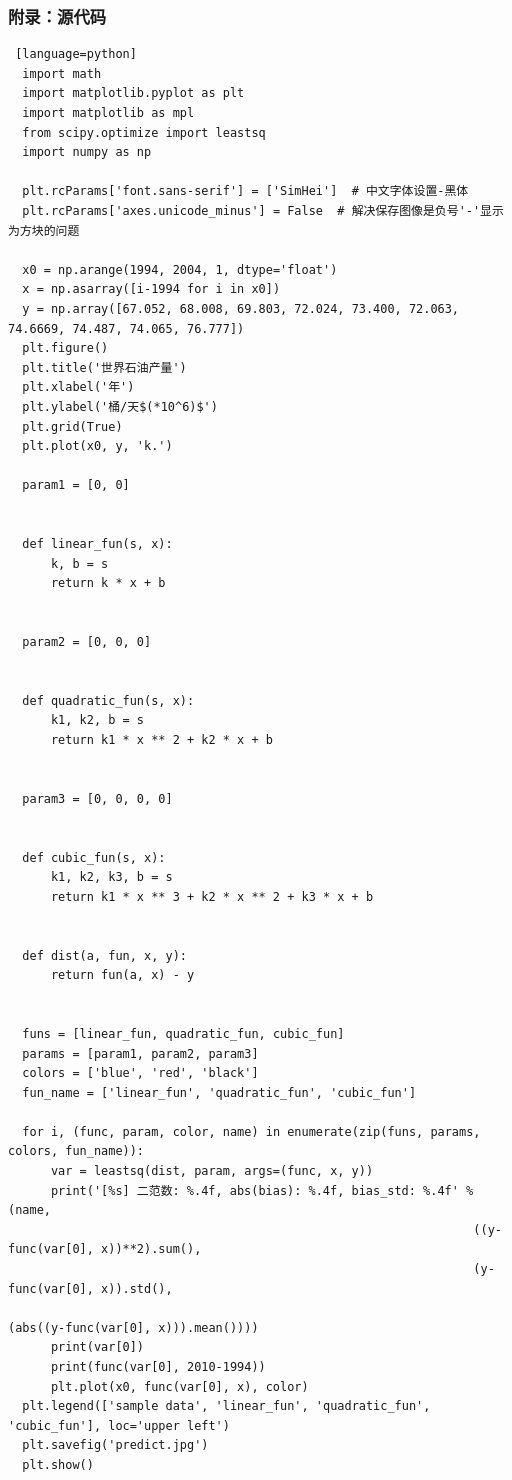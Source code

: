 \documentclass[UTF8]{ctexart}
\begin{document}
\subsubsection{附录：源代码}
\begin{lstlisting} [language=python]
  import math
  import matplotlib.pyplot as plt
  import matplotlib as mpl
  from scipy.optimize import leastsq
  import numpy as np
  
  plt.rcParams['font.sans-serif'] = ['SimHei']  # 中文字体设置-黑体
  plt.rcParams['axes.unicode_minus'] = False  # 解决保存图像是负号'-'显示为方块的问题
  
  x0 = np.arange(1994, 2004, 1, dtype='float')
  x = np.asarray([i-1994 for i in x0])
  y = np.array([67.052, 68.008, 69.803, 72.024, 73.400, 72.063, 74.6669, 74.487, 74.065, 76.777])
  plt.figure()
  plt.title('世界石油产量')
  plt.xlabel('年')
  plt.ylabel('桶/天$(*10^6)$')
  plt.grid(True)
  plt.plot(x0, y, 'k.')
  
  param1 = [0, 0]
  
  
  def linear_fun(s, x):
      k, b = s
      return k * x + b
  
  
  param2 = [0, 0, 0]
  
  
  def quadratic_fun(s, x):
      k1, k2, b = s
      return k1 * x ** 2 + k2 * x + b
  
  
  param3 = [0, 0, 0, 0]
  
  
  def cubic_fun(s, x):
      k1, k2, k3, b = s
      return k1 * x ** 3 + k2 * x ** 2 + k3 * x + b
  
  
  def dist(a, fun, x, y):
      return fun(a, x) - y
  
  
  funs = [linear_fun, quadratic_fun, cubic_fun]
  params = [param1, param2, param3]
  colors = ['blue', 'red', 'black']
  fun_name = ['linear_fun', 'quadratic_fun', 'cubic_fun']
  
  for i, (func, param, color, name) in enumerate(zip(funs, params, colors, fun_name)):
      var = leastsq(dist, param, args=(func, x, y))
      print('[%s] 二范数: %.4f, abs(bias): %.4f, bias_std: %.4f' % (name,
                                                                 ((y-func(var[0], x))**2).sum(),
                                                                 (y-func(var[0], x)).std(),
                                                                 (abs((y-func(var[0], x))).mean())))
      print(var[0])
      print(func(var[0], 2010-1994))
      plt.plot(x0, func(var[0], x), color)
  plt.legend(['sample data', 'linear_fun', 'quadratic_fun', 'cubic_fun'], loc='upper left')
  plt.savefig('predict.jpg')
  plt.show()    
\end{lstlisting}
\end{document}

